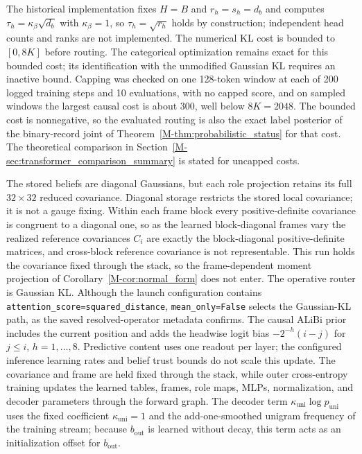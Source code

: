 \documentclass[twoside,11pt]{article}
\begin{document}
The historical implementation fixes \(H=B\) and \(r_h=s_h=d_b\) and computes \(\tau_h=\kappa_\beta\sqrt{d_b}\) with \(\kappa_\beta=1\), so \(\tau_h=\sqrt{r_h}\) holds by construction; independent head counts and ranks are not implemented. The numerical KL cost is bounded to \([0,8K]\) before routing. The categorical optimization remains exact for this bounded cost; its identification with the unmodified Gaussian KL requires an inactive bound. Capping was checked on one 128-token window at each of 200 logged training steps and 10 evaluations, with no capped score, and on sampled windows the largest causal cost is about 300, well below \(8K=2048\). The bounded cost is nonnegative, so the evaluated routing is also the exact label posterior of the binary-record joint of Theorem~\ref{M-thm:probabilistic_status} for that cost. The theoretical comparison in Section~\ref{M-sec:transformer_comparison_summary} is stated for uncapped costs.

The stored beliefs are diagonal Gaussians, but each role projection retains its full $32\times32$ reduced covariance. Diagonal storage restricts the stored local covariance; it is not a gauge fixing. Within each frame block every positive-definite covariance is congruent to a diagonal one, so as the learned block-diagonal frames vary the realized reference covariances $C_i$ are exactly the block-diagonal positive-definite matrices, and cross-block reference covariance is not representable. This run holds the covariance fixed through the stack, so the frame-dependent moment projection of Corollary~\ref{M-cor:normal_form} does not enter. The operative router is Gaussian KL. Although the launch configuration contains \texttt{attention\_\allowbreak score=squared\_\allowbreak distance}, \texttt{mean\_\allowbreak only=False} selects the Gaussian-KL path, as the saved resolved-operator metadata confirms. The causal ALiBi prior includes the current position and adds the headwise logit bias $-2^{-h}(i-j)$ for $j\le i$, $h=1,\ldots,8$. Predictive content uses one readout per layer; the configured inference learning rates and belief trust bounds do not scale this update. The covariance and frame are held fixed through the stack, while outer cross-entropy training updates the learned tables, frames, role maps, MLPs, normalization, and decoder parameters through the forward graph. The decoder term $\kappa_{\mathrm{uni}}\log p_{\mathrm{uni}}$ uses the fixed coefficient $\kappa_{\mathrm{uni}}=1$ and the add-one-smoothed unigram frequency of the training stream; because $b_{\mathrm{out}}$ is learned without decay, this term acts as an initialization offset for $b_{\mathrm{out}}$.
\end{document}
